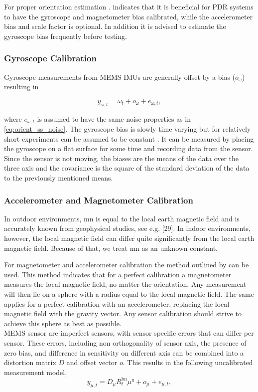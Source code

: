 For proper orientation estimation . \citet{Moder2017} indicates that it is  beneficial for PDR systems to have the gyroscope and magnetometer bias  calibrated, while the accelerometer bias and scale factor is optional. In addition it is advised to estimate the gyroscope bias frequently before testing.

\subsubsection{Gyroscope Calibration}
Gyroscope measurements from MEMS IMUs are generally offset by a bias ($o_\omega$) resulting in

\begin{equation}
	y_{\omega, t}=\omega_{t}+o_{\omega}+e_{\omega, t},
\end{equation}

where $e_{\omega, t}$ is assumed to have the same noise properties as in \cref{eq:orient_ss_noise}. The gyroscope bias is slowly time varying but for relatively short experiments can be assumed to be constant \cite{Kok2016}. It can be measured by placing the gyroscope on a flat surface for some time and recording data from the sensor. Since the sensor is not moving, the biases are the means of the data over the three axis and the covariance is the square of the standard deviation of the data to the previously mentioned means.

\subsubsection{Accelerometer and Magnetometer Calibration}
 In outdoor environments, mn is equal to the local earth magnetic field and is accurately
known from geophysical studies, see e.g. [29]. In indoor environments, however, the local magnetic
field can differ quite significantly from the local earth magnetic field. Because of that, we treat mn as
an unknown constant. 

For magnetometer and accelerometer calibration the method outlined by \citet{Kok2016} can be used. This method indicates that for a perfect calibration a magnetometer measures the local magnetic field, no matter the orientation. Any measurement will then lie on a sphere with a radius  equal to the local magnetic field. The same applies for a perfect calibration with an accelerometer, replacing the local magnetic field with the gravity vector. Any sensor calibration should strive to achieve this sphere as best as possible.\\
MEMS sensor are imperfect sensors, with sensor specific errors that can differ per sensor. These errors, including non orthogonality of sensor axis, the presence of zero bias, and difference in sensitivity on different axis \cite{Kok2016} can be combined into a distortion matrix $D$ and offset vector $o$.
This results in the following uncalibrated measurement model,
\begin{equation}
	y_{\mu, t}=D_\mu R_{t}^{\mathrm{bn}} \mu^{\mathrm{n}}+o_\mu +e_{\mu, t},
\end{equation}

